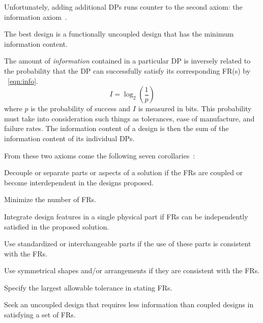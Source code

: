Unfortunately, adding additional DPs runs counter to the second axiom: the information axiom~\cite{suh}.

\begin{axiom}
  The best design is a functionally uncoupled design that has the minimum information content.
\end{axiom}

The amount of \emph{information} contained in a particular DP is inversely related to the probability that the DP
can successfully satisfy its corresponding FR(s) by \equationname~\ref{eqn:info}.
\begin{equation}
  \label{eqn:info}
  I=\log_2\left(\frac{1}{p}\right)
\end{equation}
where \(p\) is the probability of success and \(I\) is measured in bits.  This probability must take into
consideration such things as tolerances, ease of manufacture, and failure rates.  The information content of a
design is then the sum of the information content of its individual DPs.

From these two axioms come the following seven corollaries~\cite{suh}:
\begin{corollary}
  \label{cor:decouple}
  Decouple or separate parts or aspects of a solution if the FRs are coupled or become interdependent in the
  designs proposed.
\end{corollary}
\begin{corollary}
  \label{cor:minfrs}
  Minimize the number of FRs.
\end{corollary}
\begin{corollary}
  \label{cor:integrate}
  Integrate design features in a single physical part if FRs can be independently satisfied in the proposed
  solution.
\end{corollary}
\begin{corollary}
  \label{cor:standard}
  Use standardized or interchangeable parts if the use of these parts is consistent with the FRs.
\end{corollary}
\begin{corollary}
  \label{cor:shapes}
  Use symmetrical shapes and/or arrangements if they are consistent with the FRs.
\end{corollary}
\begin{corollary}
  \label{cor:tolerance}
  Specify the largest allowable tolerance in stating FRs.
\end{corollary}
\begin{corollary}
  \label{cor:uncoupled}
  Seek an uncoupled design that requires less information than coupled designs in satisfying a set of FRs.
\end{corollary}

